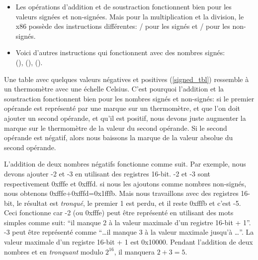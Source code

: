 \begin{itemize}
\item
	Les opérations d'addition et de soustraction fonctionnent bien pour les valeurs signées et non-signées.
	Mais pour la multiplication et la division, le x86 possède des instructions différentes:
	/ pour les signés et / pour les non-signés.
\item
	Voici d'autres instructions qui fonctionnent avec des nombres signés:\\
	 (),  (),  ().
\end{itemize}

Une table avec quelques valeurs négatives et positives (\ref{signed_tbl}) ressemble
à un thermomètre avec une échelle Celsius.
C'est pourquoi l'addition et la soustraction fonctionnent bien pour les nombres signés
et non-signés:
si le premier opérande est représenté par une marque sur un thermomètre, et que l'on
doit ajouter un second opérande, et qu'il est positif, nous devons juste augmenter
la marque sur le thermomètre de la valeur du second opérande.
Si le second opérande est négatif, alors nous baissons la marque de la valeur absolue
du second opérande.

L'addition de deux nombres négatifs fonctionne comme suit.
Par exemple, nous devons ajouter -2 et -3 en utilisant des registres 16-bit.
-2 et -3 sont respectivement 0xfffe et 0xfffd.
si nous les ajoutons comme nombres non-signés, nous obtenons 0xfffe+0xfffd=0x1fffb.
Mais nous travaillons avec des registres 16-bit, le résultat est \emph{tronqué},
le premier 1 est perdu, et il reste 0xfffb et c'est -5.
Ceci fonctionne car -2 (ou 0xfffe) peut être représenté en utilisant des mots simples
comme suit:
``il manque 2 à la valeur maximale d'un registre 16-bit + 1''.
-3 peut être représenté comme ``\dots il manque 3 à la valeur maximale jusqu'à \dots''.
La valeur maximale d'un registre 16-bit + 1 est 0x10000.
Pendant l'addition de deux nombres et en \emph{tronquant} modulo $2^{16}$, il manquera
$2+3=5$.







